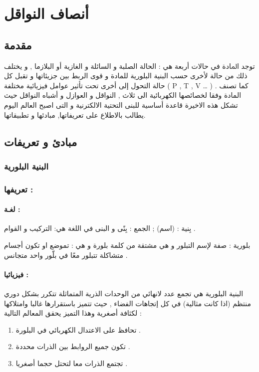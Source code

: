 
\chapter{ أنصاف النواقل }

\label{Chapter1}
\section*{مقدمة}

‫ﺗﻮﺟﺪ ‫اﳌﺎدة‬  ‬في  ‫ﺣﺎﻻت‬ ‫أرﺑﻌﺔ‬ هي : الحالة الصلبة و السائلة و الغازية أو البلازما , و يختلف ذلك من حالة لأخرى حسب البنية البلورية للمادة و قوى الربط بين جزيئاتها و تقبل كل حالة التحول  إلى أخرى تحت تأثير عوامل فيزيائية مختلفة ( P , T , V … ) .
كما تصنف المادة وفقا لخصائصها الكهربائية الى ثلاث , النواقل و العوازل و أشباه النواقل حيث تشكل هذه الاخيرة قاعدة أساسية للبنى التحتية الالكترنية و التى اصبح العالم اليوم يطالب بالاطلاع على  تعريفاتها, مبادئها و تطبيقاتها\cite{a2}.

\section{مبادئ و تعريفات}

\subsection{البنية البلورية }

\subsection*{تعريفها :}
\subsubsection*{لغـة : }
\begin{list}{}{}
	\item 
	بِنية : (اسم) ; الجمع : بِنًى و البنى في اللغة هي: التركيب و القوام .
\item	
بلورية : صفة لإسم التبلور و هي مشتقة من كلمة بلورة و هي : تموضع او تكون أجسام متشاكلة تتبلور معًا في بلّور واحد متجانس . \cite{a4}
\end{list}

\subsubsection*{فيزيائيا :}
البنیة البلوریة هي تجمع عدد لانهائي من الوحدات الذرية المتماثلة تتكرر بشكل دوري منتظم (اذا كانت مثالية) في كل إتجاهات الفضاء , حيث تتميز باستقرارها غالبا وامتلاكها لكثافة أصغرية وهذا التميز يحقق المعالم التالية :
\begin{enumerate}
	\item
	تحافظ على الاعتدال الكهربائي في البلورة .
	\item
	تكون جميع الروابط بين الذرات محددة .
	\item
	تجتمع الذرات معا لتحتل حجما أصغريا . 
\end{enumerate}

